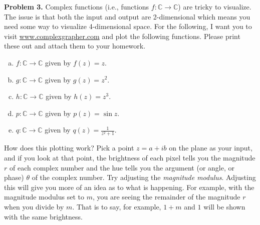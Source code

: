 \documentclass[12pt]{report} %
\newcommand{\C}{\mathbb{C}}
\theoremstyle{definition}
\begin{document}
\noindent\textbf{Problem 3.} Complex functions (i.e., functions $f\colon \C \to \C$) are tricky to visualize.  The issue is that both the input and output are 2-dimensional which means you need some way to visualize 4-dimensional space.  For the following, I want you to visit \url{www.complexgrapher.com} and plot the following functions. Please print these out and attach them to your homework. 
\begin{enumerate}[(a)]
    \item $f\colon \C \to \C$ given by $f(z)=z$.
    \item $g\colon \C \to \C$ given by $g(z)=z^2$.
    \item $h\colon \C \to \C$ given by $h(z)=z^3$.
    \item $p\colon \C \to \C$ given by $p(z)=\sin z$.
    \item $q\colon \C \to \C$ given by $q(z)=\frac{1}{z^2+1}$.
\end{enumerate}
How does this plotting work?  Pick a point $z=a+ib$ on the plane as your input, and if you look at that point, the brightness of each pixel tells you the magnitude $r$ of each complex number and the hue tells you the argument (or angle, or phase) $\theta$ of the complex number. Try adjusting the \emph{magnitude modulus}.  Adjusting this will give you more of an idea as to what is happening.  For example, with the magnitude modulus set to $m$, you are seeing the remainder of the magnitude $r$ when you divide by $m$.  That is to say, for example, $1+m$ and $1$ will be shown with the same brightness.
\end{document}
